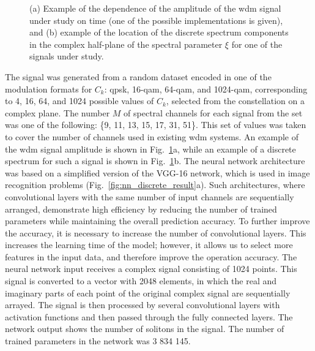 \begin{figure}[htpb]
\begin{minipage}[h]{0.5\linewidth}
{    }
    \end{minipage}
    \caption{(a) Example of the dependence of the amplitude of the \acrshort{wdm} signal under study on time (one of the possible implementations is given), and (b) example of the location of the discrete spectrum components in the complex half-plane of the spectral parameter $\xi$ for one of the signals under study.}
    \label{fig:nn_discrete_example}
\end{figure}

The signal was generated from a random dataset encoded in one of the modulation formats for $C_k$: \acrshort{qpsk}, 16-\acrshort{qam}, 64-\acrshort{qam}, and 1024-\acrshort{qam}, corresponding to 4, 16, 64, and 1024 possible values of $C_k$, selected from the constellation on a complex plane. The number $M$ of spectral channels for each signal from the set was one of the following: \{9, 11, 13, 15, 17, 31, 51\}. This set of values was taken to cover the number of channels used in existing \acrshort{wdm} systems. An example of the \acrshort{wdm} signal amplitude is shown in Fig.~\ref{fig:nn_discrete_example}a, while an example of a discrete spectrum for such a signal is shown in Fig.~\ref{fig:nn_discrete_example}b. The neural network architecture was based on a simplified version of the VGG-16 network, which is used in image recognition problems (Fig.~\ref{fig:nn_discrete_result}a). Such architectures, where convolutional layers with the same number of input channels are sequentially arranged, demonstrate high efficiency by reducing the number of trained parameters while maintaining the overall prediction accuracy. To further improve the accuracy, it is necessary to increase the number of convolutional layers. This increases the learning time of the model; however, it allows us to select more features in the input data, and therefore improve the operation accuracy. The neural network input receives a complex signal consisting of 1024 points. This signal is converted to a vector with 2048 elements, in which the real and imaginary parts of each point of the original complex signal are sequentially arrayed. The signal is then processed by several convolutional layers with activation functions and then passed
through the fully connected layers. The network output
shows the number of solitons in the signal. The number of
trained parameters in the network was 3 834 145.

